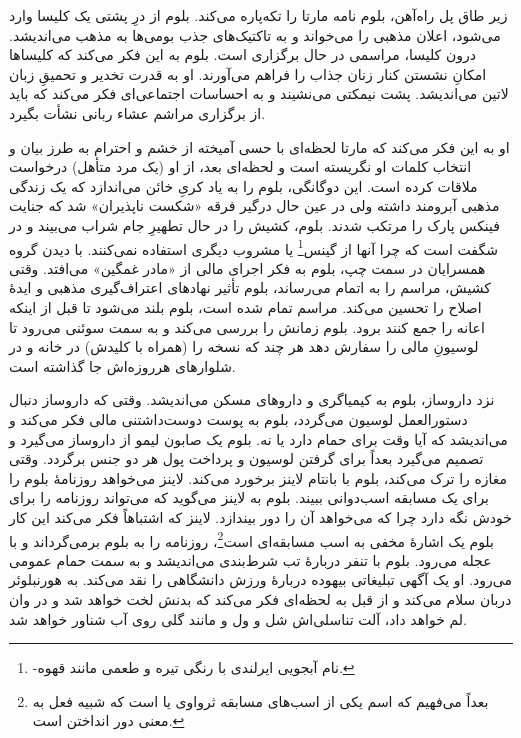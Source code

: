 \documentclass[12pt]{book}
\begin{document}
    زیر طاق پل راه‌آهن، بلوم نامه مارتا را تکه‌پاره می‌کند. بلوم از درِ پشتی یک کلیسا وارد می‌شود، اعلان مذهبی را می‌خواند و به تاکتیک‌های جذب بومی‌ها به مذهب می‌اندیشد. درون کلیسا، مراسمی در حال برگزاری است. بلوم به این فکر می‌کند که کلیساها امکانِ نشستن کنار زنان جذاب را فراهم می‌آورند. او به قدرت تخدیر و تحمیقِ زبان لاتین می‌اندیشد. پشت نیمکتی می‌نشیند و به احساسات اجتماعی‌ای فکر می‌کند که باید از برگزاری مراشم عشاء ربانی نشأت بگیرد.

    او به این فکر می‌کند که مارتا لحظه‌ای با حسی آمیخته از خشم و احترام به طرز بیان و انتخاب کلمات او نگریسته است و لحظه‌ای بعد، از او (یک مرد متأهل) درخواست ملاقات کرده است. این دوگانگی، بلوم را به یاد کریِ خائن می‌اندازد که یک زندگی مذهبی آبرومند داشته ولی در عین حال درگیر فرقه «شکست ناپذیران» شد که جنایت فینکس پارک را مرتکب شدند. بلوم، کشیش را در حال تطهیرِ جام شراب می‌بیند و در شگفت است که چرا آنها از گینس\footnote{-نام آبجویی ایرلندی با رنگی تیره و طعمی مانند قهوه.} یا مشروب دیگری استفاده نمی‌کنند. با دیدن گروه همسرایان در سمت چپ، بلوم به فکر اجرای مالی از «مادر غمگین» می‌افتد. وقتی کشیش، مراسم را به اتمام می‌رساند، بلوم تأثیر نهادهای اعتراف‌گیری مذهبی و ایدۀ اصلاح را تحسین می‌کند. مراسم تمام شده است، بلوم بلند می‌شود تا قبل از اینکه اعانه را جمع کنند برود. بلوم زمانش را بررسی می‌کند و به سمت سوئنی می‌رود تا لوسیونِ مالی را سفارش دهد هر چند که نسخه را (همراه با کلیدش) در خانه و در شلوارهای هرروزه‌اش جا گذاشته است.

    نزد داروساز، بلوم به کیمیاگری و داروهای مسکن می‌اندیشد. وقتی که داروساز دنبال دستورالعمل لوسیون می‌گردد، بلوم به پوست دوست‌داشتنی مالی فکر می‌کند و می‌اندیشد که آیا وقت برای حمام دارد یا نه. بلوم یک صابون لیمو از داروساز می‌گیرد و تصمیم می‌گیرد بعداً برای گرفتن لوسیون و پرداخت پول هر دو جنس برگردد. وقتی مغازه را ترک می‌کند، بلوم با بانتام لاینز برخورد می‌کند. لاینز می‌خواهد روزنامۀ بلوم را برای یک مسابقه اسب‌دوانی ببیند. بلوم به لاینز می‌گوید که می‌تواند روزنامه را برای خودش نگه دارد چرا که می‌خواهد آن را دور بیندازد. لاینز که اشتباهاً فکر می‌کند این کار بلوم یک اشارۀ مخفی به اسب مسابقه‌ای است\footnote{بعداً می‌فهیم که اسم یکی از اسب‌های مسابقه ثرواوی یا  است که شبیه فعل  به معنی دور انداختن است.}، روزنامه را به بلوم برمی‌گرداند و با عجله می‌رود. بلوم با تنفر دربارۀ تب شرط‌بندی می‌اندیشد و به سمت حمام عمومی می‌رود. او یک آگهی تبلیغاتی بیهوده دربارۀ ورزش دانشگاهی را نقد می‌کند. به هورنبلوئر دربان سلام می‌کند و از قبل به لحظه‌ای فکر می‌کند که بدنش لخت خواهد شد و در وان لم خواهد داد، آلت تناسلی‌اش شل و ول و مانند گلی روی آب شناور خواهد شد.
\end{document}
